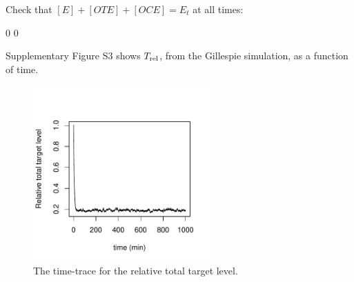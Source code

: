 \documentclass[a4paper,11pt]{article}
\newenvironment{Ncenter}{%
  \setlength\topsep{-10pt}
  \setlength\parskip{-100pt}
  \begin{center}
}{%
  \end{center}
}
\newcommand{\Trel}{T_{\rm{rel}}}
\begin{document}
Check that $[E]+[OTE]+[OCE] = E_t$ at all times:
\begin{Schunk}
\begin{Soutput}
[1] 0 0
\end{Soutput}
\end{Schunk}
Supplementary Figure S3 shows $\Trel$, from the Gillespie simulation, as a function of time.
\begin{figure}[!h]
\begin{Ncenter}
\includegraphics[width=0.6\textwidth]{SuppFile1-Trel.pdf}
\end{Ncenter}
\caption{The time-trace for the relative total target level.}\label{fig:Trel}
\end{figure}
\end{document}
